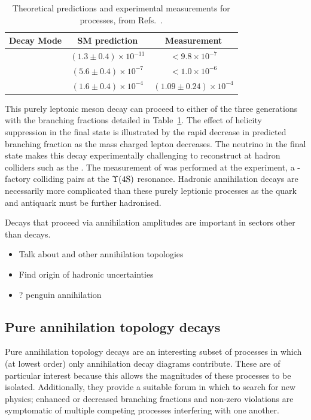 \begin{table}[h]
   \begin{center}
      \begin{tabular}{lcc}
         \hline

         Decay Mode                 & SM prediction & Measurement \\
         \hline 
         \decay{\Bp}{\ep\neue}      & $(1.3\pm0.4)\times10^{-11}$           & $<9.8\times10^{-7}$\\
         \decay{\Bp}{\mup\neum}     & $(5.6\pm0.4)\times10^{-7}$            & $<1.0\times10^{-6}$\\
         \decay{\Bp}{\taup\neut}    & $(1.6\pm0.4)\times10^{-4}$&           $(1.09\pm0.24)\times 10^{-4}$ \\
         \hline
      \end{tabular}
   \end{center}
   \caption{Theoretical predictions and experimental measurements for \decay{\Bp}{\ellp\neul} processes, from Refs.~\cite{PhysRevD.92.051102,PhysRevD.79.091101,SATOYAMA200767}.}
   \label{tab:Theory_B2ellnu}
\end{table}
This purely leptonic \Bp meson decay can proceed to either of the three generations with the branching fractions detailed in Table~\ref{tab:Theory_B2ellnu}. The effect of helicity suppression in the final state is illustrated by the rapid decrease in predicted branching fraction as the mass charged lepton decreases. The neutrino in the final state makes this decay experimentally challenging to reconstruct at hadron colliders such as the \lhc. The measurement of \decay{\Bp}{\taup\neut} was performed at the \belle experiment, a \B-factory colliding \ep\en pairs at the $\Upsilon(\text{4S})$ resonance. 
Hadronic annihilation decays are necessarily more complicated than these purely leptionic processes as the quark and antiquark must be further hadronised.

Decays that proceed via annihilation amplitudes are important in sectors other than \Bp decays. 


{\color{Red}
\begin{itemize}
\item Talk about \D and other annihilation topologies 
\item Find origin of hadronic uncertainties 
\item \decay{\Bz}{\Kp\Km}? penguin annihilation
\end{itemize}}


\subsection{Pure annihilation topology decays}
Pure annihilation topology decays are an interesting subset of processes in which (at lowest order) only annihilation decay diagrams contribute. These are of particular interest because this allows the magnitudes of these processes to be isolated. Additionally, they provide a suitable forum in which to search for new physics; enhanced or decreased branching fractions and non-zero \CP violations are symptomatic of multiple competing processes interfering with one another.  

